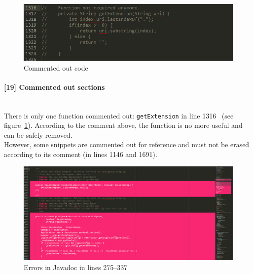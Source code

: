 \documentclass[a4paper, 11pt]{article}
\newcommand{\code}[1]{\texttt{#1}}
\newcommand{\issue}[3][?]{
    \paragraph{[#1] #2} \mbox{}\\ #3
}
\begin{document}
\begin{figure}[tb]
    \centering
    \includegraphics[width=\textwidth]{img/issue19.png}
    \caption{Commented out code}
    \label{fig:issue19}
\end{figure}

\issue[19]{Commented out sections} {
    There is only one function commented out: \code{getExtension} in line 1316 \
    (see figure~\ref{fig:issue19}).
    According to the comment above, the function is no more useful and can 
    be safely removed.  \\
    However, some snippets are commented out for reference and must not be 
    erased according to its comment (in lines 1146 and 1691). 
}

\begin{figure}[tb]
    \centering
    \includegraphics[width=\textwidth]{img/jdoc.png}
    \caption{Errors in Javadoc in lines 275--337}
    \label{fig:jdoc}
\end{figure}
\end{document}
